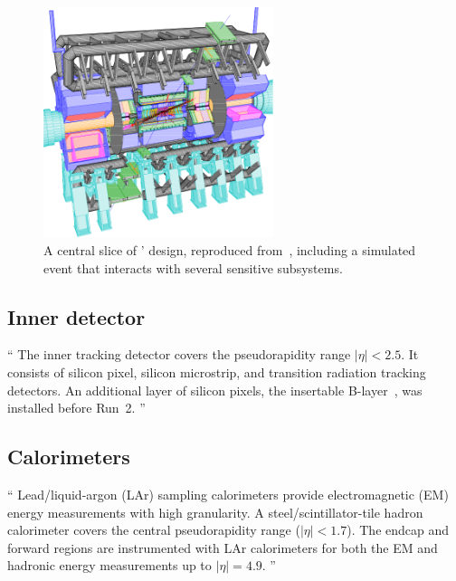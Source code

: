 \begin{figure}[tp]
\centering
\includegraphics[width=0.6\textwidth]{figures/atlas_cutaway_volume_1.pdf}
\caption[
A central slice of \atlas' design
]{%
A central slice of \atlas' design, reproduced from~\cite{atlas1999design1},
including a simulated event that interacts with several sensitive subsystems.
}
\label{fig:atlas_cutaway}
\end{figure}


\subsection{Inner detector}
\label{sec:atlas_inner}
\begin{displayquote}
``%
The inner tracking detector covers the pseudorapidity range $|\eta| < 2.5$.
It consists of silicon pixel, silicon microstrip, and transition radiation
tracking detectors.
An additional layer of silicon pixels, the insertable
B-layer~\cite{ATLAS-TDR-19, PIX-2018-001}, was installed before Run~2.%
''~\cite{atlas2022searches}
\end{displayquote}


\subsection{Calorimeters}
\label{sec:atlas_calo}
\begin{displayquote}
``%
Lead/liquid-argon (LAr) sampling calorimeters provide electromagnetic (EM)
energy measurements with high granularity.
A steel/scintillator-tile hadron calorimeter covers the central pseudorapidity
range ($|\eta| < 1.7$).
The endcap and forward regions are instrumented with LAr calorimeters for both
the EM and hadronic energy measurements up to $|\eta| = 4.9$.%
''~\cite{atlas2022searches}
\end{displayquote}

